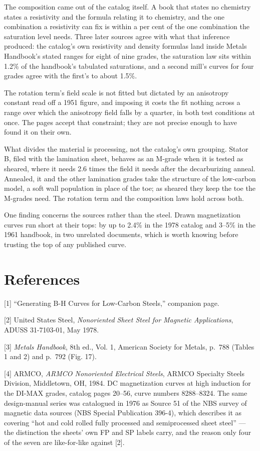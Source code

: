 \documentclass[
  11pt,
]{article}
\begin{document}
The composition came out of the catalog itself. A book that states no chemistry states a resistivity and the formula relating it to chemistry, and the one combination a resistivity can fix is within a per cent of the one combination the saturation level needs. Three later sources agree with what that inference produced: the catalog's own resistivity and density formulas land inside Metals Handbook's stated ranges for eight of nine grades, the saturation law sits within 1.2\% of the handbook's tabulated saturations, and a second mill's curves for four grades agree with the first's to about 1.5\%.

The rotation term's field scale is not fitted but dictated by an anisotropy constant read off a 1951 figure, and imposing it costs the fit nothing across a range over which the anisotropy field falls by a quarter, in both test conditions at once. The pages accept that constraint; they are not precise enough to have found it on their own.

What divides the material is processing, not the catalog's own grouping. Stator B, filed with the lamination sheet, behaves as an M-grade when it is tested as sheared, where it needs 2.6 times the field it needs after the decarburizing anneal. Annealed, it and the other lamination grades take the structure of the low-carbon model, a soft wall population in place of the toe; as sheared they keep the toe the M-grades need. The rotation term and the composition laws hold across both.

One finding concerns the sources rather than the steel. Drawn magnetization curves run short at their tops: by up to 2.4\% in the 1978 catalog and 3--5\% in the 1961 handbook, in two unrelated documents, which is worth knowing before trusting the top of any published curve.

\section{References}\label{references}

{[}1{]} ``Generating B-H Curves for Low-Carbon Steels,'' companion page.

{[}2{]} United States Steel, \emph{Nonoriented Sheet Steel for Magnetic Applications}, ADUSS 31-7103-01, May 1978.

{[}3{]} \emph{Metals Handbook}, 8th ed., Vol. 1, American Society for Metals, p.~788 (Tables 1 and 2) and p.~792 (Fig. 17).

{[}4{]} ARMCO, \emph{ARMCO Nonoriented Electrical Steels}, ARMCO Specialty Steels Division, Middletown, OH, 1984. DC magnetization curves at high induction for the DI-MAX grades, catalog pages 20--56, curve numbers 8288--8324. The same design-manual series was catalogued in 1976 as Source 51 of the NBS survey of magnetic data sources (NBS Special Publication 396-4), which describes it as covering ``hot and cold rolled fully processed and semiprocessed sheet steel'' --- the distinction the sheets' own FP and SP labels carry, and the reason only four of the seven are like-for-like against {[}2{]}.
\end{document}
